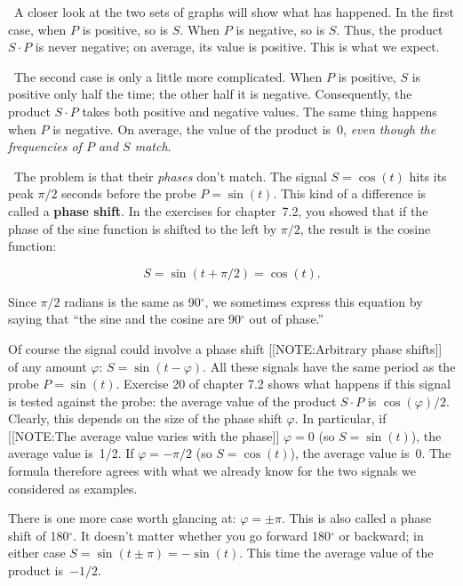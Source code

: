\quad \ A closer look at the two sets of graphs will show what has
happened.  In the first case, when $P$ is positive, so is $S$.  When
$P$ is negative, so is $S$.  Thus, the product $S \cdot P$ is never
negative; on average, its value is positive.  This is what we expect.

\quad \ The second case is only a little more complicated.  When $P$
is positive, $S$ is positive only half the time; the other half it is
negative.  Consequently, the product $S \cdot P$ takes both positive
and negative values.  The same thing happens when $P$ is negative.  On
average, the value of the product is~0, {\em even though the
  frequencies of $P$ and $S$ match}.
	
\quad \ The problem is that their {\em phases\/} don't match.  The
signal $S = \cos(t)$ hits its peak $\pi/2$ seconds before the probe $P
= \sin(t)$.  This kind of a difference is called a {\bf phase shift}.
In the exercises for chapter~7.2, you showed that if the phase of the
sine function is shifted to the left by $\pi/2$, the result is the
cosine function:

	\[
S = \sin(t + \pi/2) = \cos(t).
\]












Since $\pi/2$ radians is the same as 90$^\circ$, we sometimes express
this equation by saying that ``the sine and the cosine are 90$^\circ$
out of phase.''

Of course the signal could involve a phase shift 
[[NOTE:Arbitrary phase shifts]]	
of any amount $\varphi$: $S = \sin(t - \varphi)$.  All these signals
have the same period as the probe $P = \sin(t)$.  Exercise 20 of
chapter 7.2 shows what happens if this signal is tested against the
probe: the average value of the product $S \cdot P$ is
$\cos(\varphi)/2$.  Clearly, this depends on the size of the phase
shift $\varphi$.  In particular, if [[NOTE:The average value varies with
  the phase]] $\varphi = 0$ (so $S = \sin(t)$), the average value
is~1/2.  If $\varphi = -\pi/2$ (so $S = \cos(t)$), the average value
is~0.  The formula therefore agrees with what we already know for the
two signals we considered as examples.

There is one more case worth glancing at: $\varphi = \pm \pi$.  This
is also called a phase shift of 180$^\circ$.  It doesn't matter
whether you go forward 180$^\circ$ or backward; in either case $S =
\sin(t \pm \pi) = -\sin(t)$.  This time the average value of the
product is~$-1/2$.

